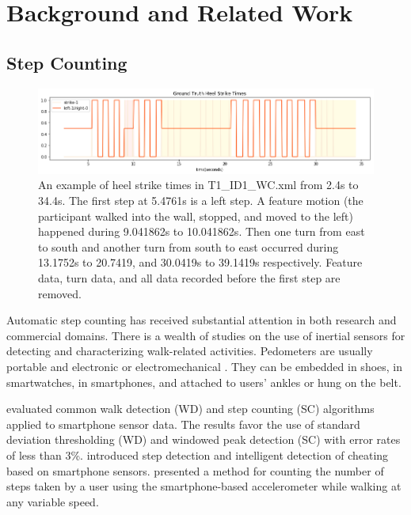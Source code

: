 \documentclass[11pt]{article}
\begin{document}
{\section{Background and Related Work}

\subsection{Step Counting}

\begin{figure}[htb]
\centering
\includegraphics[scale=0.5]{ground_truth_2}
\caption{An example of heel strike times in T1\_ID1\_WC.xml from 2.4s to 34.4s. The first step at 5.4761s is a left step. A feature motion (the participant walked into the wall, stopped, and moved to the left) happened during 9.041862s to 10.041862s. Then one turn from east to south and another turn from south to east occurred during 13.1752s to 20.7419, and 30.0419s to 39.1419s respectively. Feature data, turn data, and all data recorded before the first step are removed.}
\label{fig:ground_truth}
\end{figure}


Automatic step counting has received substantial attention in both research and commercial domains. There is a wealth of studies on the use of inertial sensors for detecting and characterizing walk-related activities. Pedometers are usually portable and electronic or electromechanical \cite{wiki:pedometer}. They can be embedded in shoes, in smartwatches, in smartphones, and attached to users' ankles or hung on the belt.

\cite{brajdic2013walk} evaluated common walk detection (WD) and step counting (SC) algorithms applied to smartphone sensor data. The results favor the use of standard deviation thresholding (WD) and windowed peak detection (SC) with error rates of less than 3\%.
\cite{tomlein2012advanced} introduced step detection and intelligent detection of cheating based on smartphone sensors.
\cite{naqvib2012step} presented a method for counting the number of steps taken by a user using the smartphone-based accelerometer while walking at any variable speed.

}
\end{document}
